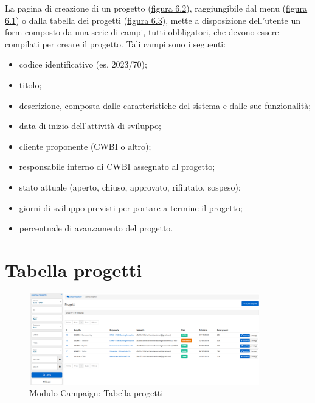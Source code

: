 \noindent La pagina di creazione di un progetto ({\hyperref[fig:nuovoProgetto]{figura 6.2}}), raggiungibile dal menu ({\hyperref[fig:menu]{figura 6.1}}) o dalla tabella dei progetti ({\hyperref[fig:tabellaProgetti]{figura 6.3}}), mette a disposizione dell'utente un form composto da una serie di campi, tutti obbligatori, che devono essere compilati per creare il progetto. Tali campi sono i seguenti:
\begin{itemize}
\item codice identificativo (es. 2023/70);
\item titolo;
\item descrizione, composta dalle caratteristiche del sistema e dalle sue funzionalità;
\item data di inizio dell'attività di sviluppo;
\item cliente proponente (CWBI o altro);
\item responsabile interno di CWBI assegnato al progetto;
\item stato attuale (aperto, chiuso, approvato, rifiutato, sospeso);
\item giorni di sviluppo previsti per portare a termine il progetto;
\item percentuale di avanzamento del progetto.
\end{itemize}

\pagebreak

\section{Tabella progetti}
\begin{figure}[!h]
\centering
\includegraphics[width=380px, height=150px]{../images/UI/03-tabellaProgetti.png}
\caption{Modulo Campaign: Tabella progetti}
\label{fig:tabellaProgetti}
\end{figure}

